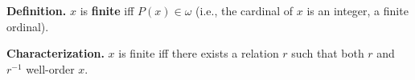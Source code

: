 \textbf{Definition.} $x$ is \textbf{finite} iff $P(x) \in \omega$ (i.e., the cardinal of $x$ is an integer, a finite ordinal).

\textbf{Characterization.} $x$ is finite iff there exists a relation $r$ such that both $r$ and $r^{-1}$ well-order $x$.
